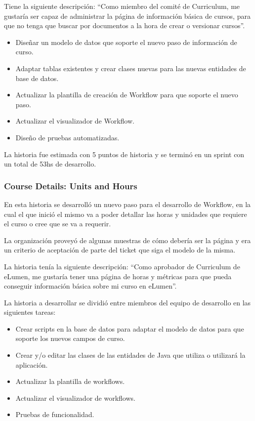 Tiene la siguiente descripción: “Como miembro del comité de Curriculum, me gustaría ser capaz de administrar la página de información básica de cursos, para que no tenga que buscar por documentos a la hora de crear o versionar cursos”.

\begin{itemize}
	\item Diseñar un modelo de datos que soporte el nuevo paso de información de curso.
	\item Adaptar tablas existentes y crear clases nuevas para las nuevas entidades de base de datos.
	\item Actualizar la plantilla de creación de Workflow para que soporte el nuevo paso.
	\item Actualizar el visualizador de Workflow.
	\item Diseño de pruebas automatizadas.
\end{itemize}

La historia fue estimada con 5 puntos de historia y se terminó en un sprint con un total de 53hs de desarrollo.

\subsubsection{Course Details: Units and Hours}
En esta historia se desarrolló un nuevo paso para el desarrollo de Workflow, en la cual el que inició el mismo va a poder detallar las horas y unidades que requiere el curso o cree que se va a requerir.

La organización proveyó de algunas muestras de cómo debería ser la página y era un criterio de aceptación de parte del ticket que siga el modelo de la misma.

La historia tenía la siguiente descripción: “Como aprobador de Curriculum de eLumen, me gustaría tener una página de horas y métricas para que pueda conseguir información básica sobre mi curso en eLumen”.

La historia a desarrollar se dividió entre miembros del equipo de desarrollo en las siguientes tareas:
\begin{itemize}
	\item Crear scripts en la base de datos para adaptar el modelo de datos para que soporte los nuevos campos de curso.
	\item Crear y/o editar las clases de las entidades de Java que utiliza o utilizará la aplicación.
	\item Actualizar la plantilla de workflows.
	\item Actualizar el visualizador de workflows.
	\item Pruebas de funcionalidad.
\end{itemize}

